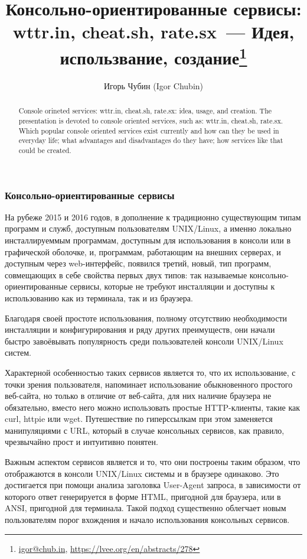 \documentclass[10pt, a5paper]{article}
\begin{document}
\title{Консольно-ориентированные сервисы: wttr.in, cheat.sh, rate.sx~--- Идея, использвание, создание\footnote{\url{igor@chub.in}, \url{https://lvee.org/en/abstracts/278}}}
\author{Игорь Чубин (Igor Chubin)}
\maketitle
\begin{abstract}
Console orineted services: wttr.in, cheat.sh, rate.sx: idea, usage, and creation. 
The presentation is devoted to console oriented services, such as: wttr.in, cheat.sh, rate.sx. Which popular console oriented services exist currently and how can they be used in everyday life; what advantages and disadvantages do they have; how services like that could be created.
\end{abstract}


\subsubsection*{Консольно-ориентированные сервисы}

На рубеже 2015 и 2016 годов, в дополнение к традиционно существующим типам
программ и служб, доступным пользователям UNIX/Linux, а именно локально инсталлируеммым программам, доступным для использования в консоли или в графической оболочке, и, программам, работающим на внешних серверах, и доступным через web-интерфейс, появился третий, новый, тип программ, совмещающих в себе свойства первых двух типов: так называемые консольно-ориентированные сервисы, которые не требуют инсталляции и доступны к использованию как из терминала, так и из браузера.

Благодаря своей простоте использования, полному отсутствию необходимости
инсталляции и конфигурирования и ряду других преимуществ, они начали быстро завоёвывать популярность среди пользователей
консоли UNIX/Linux систем.

Характерной особенностью таких сервисов является то, что их использование, с точки зрения пользователя, напоминает использование обыкновенного простого веб-сайта, но только в отличие от веб-сайта, для них наличие браузера
не обязательно, вместо него можно использовать простые HTTP-клиенты,
такие как curl, httpie или wget. Путешествие по гиперссылкам при этом
заменяется манипуляциями с URL, который в случае консольных сервисов,
как правило, чрезвычайно прост и интуитивно понятен.

Важным аспектом сервисов является и то, что они построены таким образом,
что отображаются в консоли UNIX/Linux системы и в браузере одинаково.
Это достигается при помощи анализа заголовка User-Agent запроса,
в зависимости от которого ответ генерируется в форме HTML, пригодной для браузера, или в ANSI, пригодной для терминала. Такой подход существенно облегчает новым пользователям порог вхождения и начало использования консольных сервисов.
\end{document}
